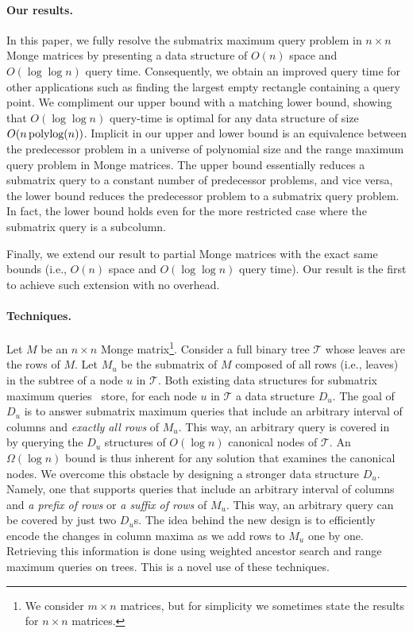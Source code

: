 \documentclass{llncs}
\newcommand{\polylog}{\text{\,polylog}}
\begin{document}
\paragraph{\bf Our results.} 
In this paper, we fully resolve the submatrix maximum
query problem in $n\times n$ Monge matrices by presenting a data structure of $O(n)$ space and $O(\log\log n)$ query time. 
Consequently, we obtain an improved query time for other applications such as finding the largest empty
rectangle containing a query point. 
We compliment our upper bound with a matching lower bound, showing
that $O(\log\log n)$ query-time is optimal for any data structure of
size $O(n\polylog(n))$. 
Implicit in our upper and lower bound is an equivalence
between the predecessor problem in a universe of polynomial size and the range maximum query problem in
Monge matrices. The upper bound essentially reduces a submatrix
query to a constant number of predecessor problems, and vice versa, the lower bound
reduces the predecessor problem to a submatrix query problem. In fact, the lower bound holds even for the more restricted case where the submatrix query is a subcolumn.

Finally, we extend our result to partial Monge matrices with the exact
same bounds (i.e., $O(n)$ space and $O(\log\log n)$ query time). Our
result is the first to achieve such extension with no overhead. 



\paragraph{\bf Techniques.} 
Let $M$ be an $n \times n$ Monge matrix\footnote{We consider $m \times n$ matrices, but for simplicity we sometimes state the
results for $n \times n$ matrices.}. Consider a full binary tree
$\mathcal T$ whose leaves are the rows of $M$. Let $M_u$ be the
submatrix of $M$ composed of all rows (i.e., leaves) in the subtree of
a node $u$ in $\mathcal T$.
Both existing data structures for submatrix maximum queries~\cite{ourICALP,KaplanMozesNussbaumSharir} store, for each node $u$ in $\mathcal T$ a data structure $D_u$. The goal of $D_u$ is to answer submatrix maximum queries  that include an arbitrary interval of columns and {\em exactly all rows}  of $M_u$.   
This way, an arbitrary query is covered
in~\cite{ourICALP,KaplanMozesNussbaumSharir} by querying the $D_u$ structures of $O(\log n)$ canonical nodes of $\mathcal T$.  An $\Omega(\log n)$ bound is thus inherent for any solution that examines the canonical nodes. 
We overcome this obstacle by designing a stronger data
structure $D_u$. Namely, one that supports  queries
that include an arbitrary interval of columns and {\em a prefix of
  rows} or {\em a suffix of rows} of $M_u$. 
This way, an arbitrary query can be covered by just two $D_u$s. The
idea behind the new design  is to efficiently  encode the changes in column maxima as we add rows to $M_u$ one by one. Retrieving this information is done using weighted ancestor search and range maximum queries on trees. This is a novel use of these techniques.     
\end{document}
